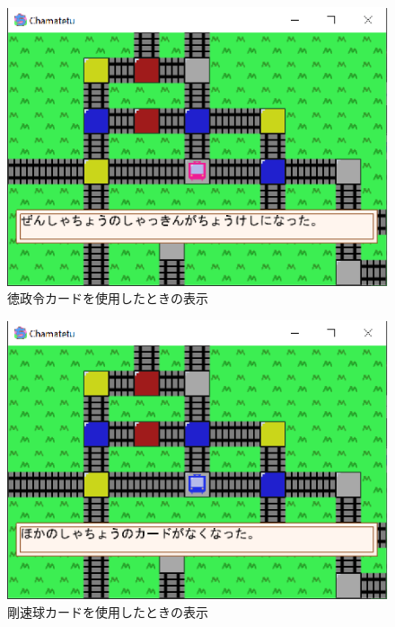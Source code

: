 \documentclass[a4j]{jarticle}
\begin{document}
        \begin{figure}[H]
            \centering
            \includegraphics[scale=1.3]{tokuseirei.eps}
            \caption{徳政令カードを使用したときの表示}
             \label{c7}
            \end{figure}

            \begin{figure}[H]
                \centering
                \includegraphics[scale=1.3]{kyu.eps}
                \caption{剛速球カードを使用したときの表示}
                 \label{c8}
                \end{figure}
\end{document}
